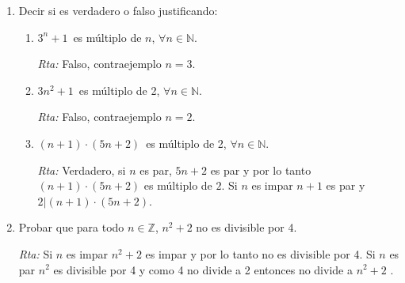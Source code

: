 \documentclass[a4paper,12pt,twoside,spanish,reqno]{amsbook}
\numberwithin{equation}{section}
\newcommand{\rta}{\noindent\textit{Rta: }}
\begin{document}
\begin{enumerate}
\begin{enumerate}
    \item $3^{2n+2} - 8n - 9$\, es divisible por 64.
    
    \rta Lo haremos por inducción. El caso base es $n=1$ y  en ese caso debemos ver que $64|3^{2\cdot 1+2} - 8\cdot 1 - 9 = 3^4-8-9 = 81-17 =64$, lo cual esta bien.
    
    Supongamos que $64|3^{2n+2} - 8n - 9$ (HI),  entonces debemos probar que $64|3^{2(n+1)+2} - 8(n+1) - 9 = 9\cdot 3^{2n+2} - 8n -17$. 
    
    Ahora bien   
    \begin{align*}
        9\cdot 3^{2n+2} - 8n -17 &=  9\cdot (3^{2n+2} - 8n - 9 + 8n + 9) - 8n -17 \\
        &=   9\cdot (3^{2n+2} - 8n - 9) + 9\cdot(8n + 9) - 8n -17 \\
        &=  9\cdot (3^{2n+2} - 8n - 9) + 72n + 81 - 8n -17 \\
        &= 9\cdot (3^{2n+2} - 8n - 9) + 64(n+1).
    \end{align*}
    El primer término es múltiplo de 64 por HI y  el segundo es $64(n+1)$ que claramente es múltiplo de 64.

\end{enumerate}



\item Decir si es verdadero o falso justificando:
\begin{enumerate}
    \item $3^n+1$\, es múltiplo de $n$, $\forall n \in {\mathbb N}$.
    
    \rta Falso, contraejemplo $n=3$.
    
    \item $3n^2+1$\, es múltiplo de 2, $\forall n \in {\mathbb N}$.
    
    \rta Falso, contraejemplo $n=2$.
    
    \item $(n+1)\cdot (5n+2)$\, es múltiplo de 2, $\forall n \in {\mathbb N}$.
    
    \rta Verdadero, si $n$ es par,  $5n+2$ es par y por lo tanto $(n + 1) \cdot (5n + 2)$ es múltiplo de $2$.    Si $n$ es impar $n+1$ es par y $2\vert (n + 1) \cdot (5n + 2)$.
\end{enumerate}



\item Probar que para todo $n \in {\mathbb Z}$, $n^2 + 2$ no es divisible por 4.

\rta Si $n$ es impar $n^2+2$ es impar y por lo tanto no es divisible por 4.
Si $n$ es par $n^2$ es divisible por 4 y como 4 no divide a 2 entonces no divide a $n^2+2$ .



\end{enumerate}
\end{document}
